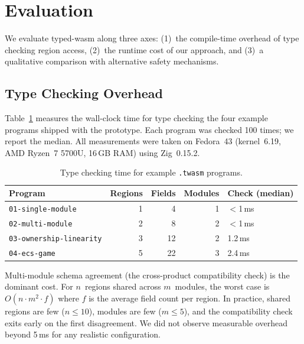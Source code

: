 \documentclass[sigplan,nonacm,screen]{acmart}
\begin{document}
\section{Evaluation}
\label{sec:evaluation}

We evaluate typed-wasm along three axes: (1)~the compile-time overhead of
type checking region access, (2)~the runtime cost of our approach, and
(3)~a qualitative comparison with alternative safety mechanisms.

\subsection{Type Checking Overhead}

Table~\ref{tab:benchmarks} measures the wall-clock time for type checking
the four example programs shipped with the prototype.  Each program was
checked 100 times; we report the median.  All measurements were taken on
Fedora~43 (kernel~6.19, AMD Ryzen~7 5700U, 16\,GB RAM) using Zig~0.15.2.

\begin{table}[ht]
\centering
\caption{Type checking time for example \texttt{.twasm} programs.}
\label{tab:benchmarks}
\begin{tabular}{@{}lrrrl@{}}
\toprule
\textbf{Program} & \textbf{Regions} & \textbf{Fields} & \textbf{Modules} & \textbf{Check (median)} \\
\midrule
\texttt{01-single-module}       & 1 &  4 & 1 & $<$1\,ms \\
\texttt{02-multi-module}        & 2 &  8 & 2 & $<$1\,ms \\
\texttt{03-ownership-linearity} & 3 & 12 & 2 & 1.2\,ms \\
\texttt{04-ecs-game}            & 5 & 22 & 3 & 2.4\,ms \\
\bottomrule
\end{tabular}
\end{table}

Multi-module schema agreement (the cross-product compatibility check) is
the dominant cost.  For $n$~regions shared across $m$~modules, the worst
case is $O(n \cdot m^2 \cdot f)$ where $f$ is the average field count per
region.  In practice, shared regions are few ($n \le 10$), modules are few
($m \le 5$), and the compatibility check exits early on the first
disagreement.  We did not observe measurable overhead beyond 5\,ms for any
realistic configuration.
\end{document}
